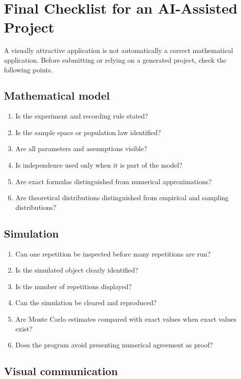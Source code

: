 \section{Final Checklist for an AI-Assisted Project}

A visually attractive application is not automatically a correct mathematical application. Before submitting or relying on a generated project, check the following points.

\subsection*{Mathematical model}

\begin{enumerate}
    \item Is the experiment and recording rule stated?
    \item Is the sample space or population law identified?
    \item Are all parameters and assumptions visible?
    \item Is independence used only when it is part of the model?
    \item Are exact formulas distinguished from numerical approximations?
    \item Are theoretical distributions distinguished from empirical and sampling distributions?
\end{enumerate}

\subsection*{Simulation}

\begin{enumerate}
    \item Can one repetition be inspected before many repetitions are run?
    \item Is the simulated object clearly identified?
    \item Is the number of repetitions displayed?
    \item Can the simulation be cleared and reproduced?
    \item Are Monte Carlo estimates compared with exact values when exact values exist?
    \item Does the program avoid presenting numerical agreement as proof?
\end{enumerate}

\subsection*{Visual communication}


